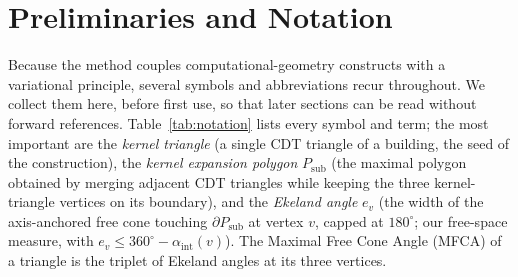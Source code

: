 \documentclass[10pt]{article}
\theoremstyle{plain}
\theoremstyle{definition}
\begin{document}
\section{Preliminaries and Notation}
\label{sec:notation}

Because the method couples computational-geometry constructs with a variational
principle, several symbols and abbreviations recur throughout.
We collect them here, before first use, so that later sections can be read
without forward references.
Table~\ref{tab:notation} lists every symbol and term; the most important are
the \emph{kernel triangle} (a single CDT triangle of a building, the seed of
the construction), the \emph{kernel expansion polygon} $P_{\mathrm{sub}}$ (the
maximal polygon obtained by merging adjacent CDT triangles while keeping the
three kernel-triangle vertices on its boundary), and the \emph{Ekeland angle}
$e_v$ (the width of the axis-anchored free cone touching $\partial P_{\mathrm{sub}}$
at vertex $v$, capped at $180^\circ$; our free-space measure, with
$e_v\le 360^\circ-\alpha_{\mathrm{int}}(v)$). The Maximal Free
Cone Angle (MFCA) of a triangle is the triplet of Ekeland angles at its three
vertices.
\end{document}
